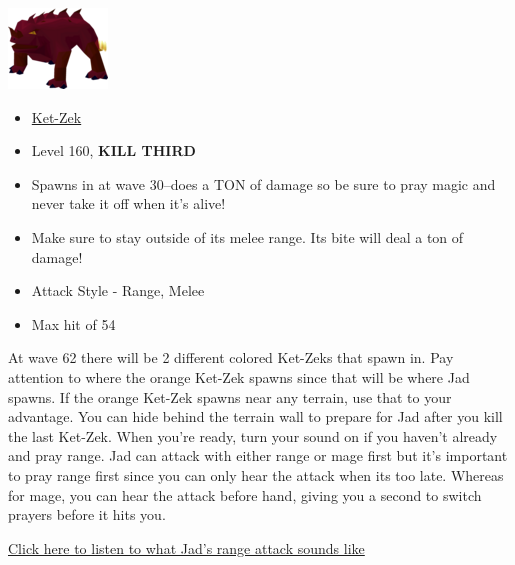 \documentclass{article}
\begin{document}
\begin{multicols}{2}
  \null \vfill
  \includegraphics[width=.3\textwidth]{ketzek.png}
  \vfill \null
\columnbreak
  \null \vfill
  \begin{itemize}
    \item \underline{Ket-Zek}
    \item Level 160, \textbf{KILL THIRD}
    \item Spawns in at wave 30--does a TON of damage so be sure to pray magic and never take it off when it's alive!
    \item Make sure to stay outside of its melee range. Its bite will deal a ton of damage!
    \item Attack Style - Range, Melee
    \item Max hit of 54
  \end{itemize}
  \vfill \null
\end{multicols}
 \normalsize At wave 62 there will be 2 different colored Ket-Zeks that spawn in. Pay attention to where the orange Ket-Zek spawns since that will be where Jad spawns. If the orange Ket-Zek spawns near any terrain, use that to your advantage. You can hide behind the terrain wall to prepare for Jad after you kill the last Ket-Zek. When you're ready, turn your sound on if you haven't already and pray range. Jad can attack with either range or mage first but it's important to pray range first since you can only hear the attack when its too late. Whereas for mage, you can hear the attack before hand, giving you a second to switch prayers before it hits you. 

 \vspace{5mm}
 \centering
\href{https://oldschool.runescape.wiki/index.php?title=File\%3ATzTok-Jad_Ranged_attack.ogg}
    {Click here to listen to what Jad's range attack sounds like}
\end{document}
